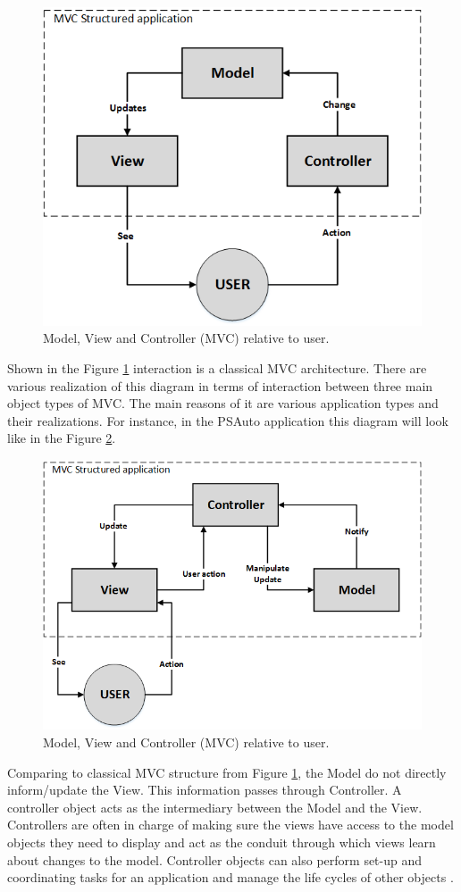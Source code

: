 \begin{figure}[ht]\centering
\includegraphics[width=0.7\linewidth]{Data/Control_Software/MVC_general.png}
\caption{Model, View and Controller (MVC) relative to user.}
\label{fig:mvc_general}
\end{figure}

Shown in the Figure \ref{fig:mvc_general} interaction is a classical MVC architecture. There are various realization of this diagram in terms of interaction between three main object types of MVC. The main reasons of it are various application types and their realizations. For instance, in the PSAuto application this diagram will look like in the Figure \ref{fig:mvc_custom}.

\begin{figure}[ht]\centering
\includegraphics[width=0.7\linewidth]{Data/Control_Software/MVC_custom.png}
\caption{Model, View and Controller (MVC) relative to user.}
\label{fig:mvc_custom}
\end{figure}

Comparing to classical MVC structure from Figure \ref{fig:mvc_general}, the Model do not directly inform/update the View. This information passes through Controller. A controller object acts as the intermediary between the Model and the View. Controllers are often in charge of making sure the views have access to the model objects they need to display and act as the conduit through which views learn about changes to the model. Controller objects can also perform set-up and coordinating tasks for an application and manage the life cycles of other objects \cite{apple_MVC}.

